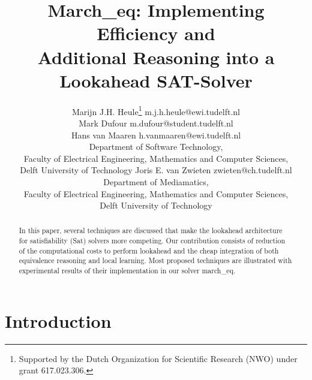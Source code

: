 \documentclass[twoside,11pt]{article}
\begin{document}
\title{March\_eq: Implementing Efficiency and\\ Additional Reasoning into a Lookahead SAT-Solver}

\author{\name Marijn J.H. Heule\thanks{Supported by the Dutch Organization for
	Scientific Research (NWO) under grant 617.023.306.}
	 \email m.j.h.heule@ewi.tudelft.nl \\
	 \name Mark Dufour \email m.dufour@student.tudelft.nl \\
       \name Hans van Maaren \email h.vanmaaren@ewi.tudelft.nl \\
	 \addr Department of Software Technology, \\
	 Faculty of Electrical Engineering, Mathematics and Computer Sciences, \\
	 Delft University of Technology 
       \AND
       \name Joris E. van Zwieten \email zwieten@ch.tudelft.nl \\
	 \addr Department of Mediamatics, \\
	 Faculty of Electrical Engineering, Mathematics and Computer Sciences, \\
	 Delft University of Technology}
       
\maketitle

\begin{abstract}
In this paper, several techniques are discussed that make the lookahead architecture
for satisfiability ({\sc Sat}) solvers more competing. Our contribution consists of
reduction of the computational costs to perform lookahead and the cheap integration
of both equivalence reasoning and local learning. Most proposed techniques are 
illustrated with experimental results of their implementation in our solver {\sf march\_eq}. 
\end{abstract}



\section{Introduction}
\label{sec:intro}

\newcommand{\Sat}{{\sc Sat} }
\newcommand{\Diff}{{\sc Diff} }
\newcommand{\iupf}[1]{IUP($\mathcal{F} \cup \{ #1 \}$)}
\end{document}
